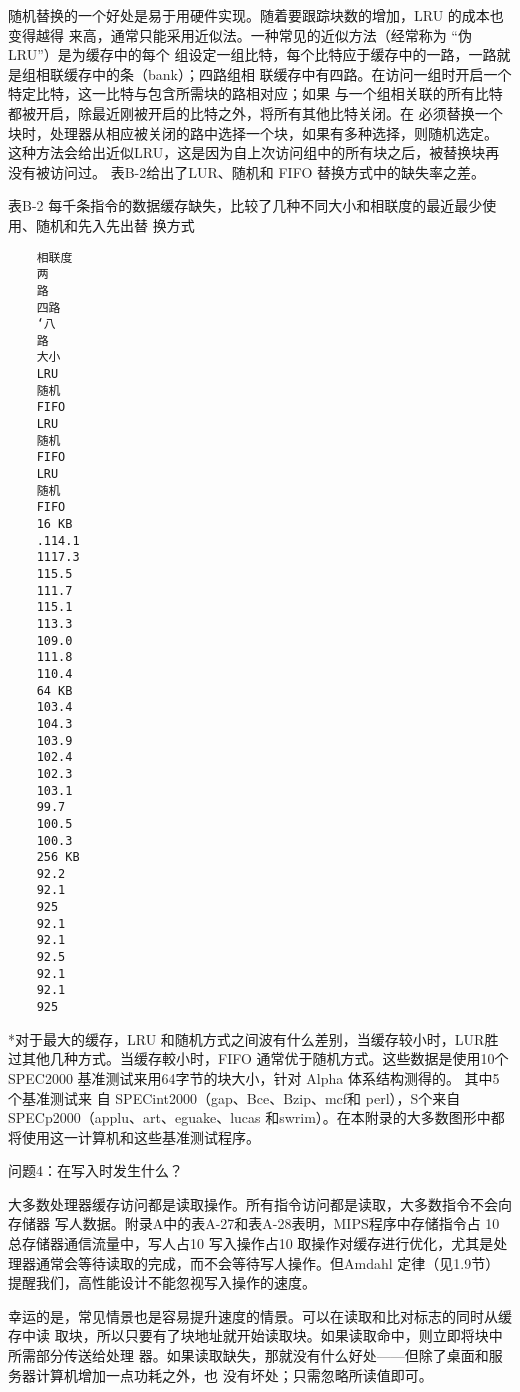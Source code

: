随机替换的一个好处是易于用硬件实现。随着要跟踪块数的增加，LRU 的成本也变得越得
来高，通常只能采用近似法。一种常见的近似方法（经常称为 “伪 LRU”）是为缓存中的每个
组设定一组比特，每个比特应于缓存中的一路，一路就是组相联缓存中的条（bank）；四路组相
联缓存中有四路。在访问一组时开启一个特定比特，这一比特与包含所需块的路相对应；如果
与一个组相关联的所有比特都被开启，除最近刚被开启的比特之外，将所有其他比特关闭。在
必须替换一个块时，处理器从相应被关闭的路中选择一个块，如果有多种选择，则随机选定。
这种方法会给出近似LRU，这是因为自上次访问组中的所有块之后，被替换块再没有被访问过。
表B-2给出了LUR、随机和 FIFO 替换方式中的缺失率之差。


表B-2 每千条指令的数据缓存缺失，比较了几种不同大小和相联度的最近最少使用、随机和先入先出替
换方式
\begin{verbatim}
    相联度
    两
    路
    四路
    ‘八
    路
    大小
    LRU
    随机
    FIFO
    LRU
    随机
    FIFO
    LRU
    随机
    FIFO
    16 KB
    .114.1
    1117.3
    115.5
    111.7
    115.1
    113.3
    109.0
    111.8
    110.4
    64 KB
    103.4
    104.3
    103.9
    102.4
    102.3
    103.1
    99.7
    100.5
    100.3
    256 KB
    92.2
    92.1
    925
    92.1
    92.1
    92.5
    92.1
    92.1
    925
\end{verbatim}
*对于最大的缓存，LRU 和随机方式之间波有什么差别，当缓存较小时，LUR胜过其他几种方式。当缓存較小时，FIFO
通常优于随机方式。这些数据是使用10个 SPEC2000 基准测试来用64字节的块大小，针对 Alpha 体系结构测得的。
其中5个基准测试来 自 SPECint2000（gap、Bce、Bzip、mcf和 perl），S个来自 SPECp2000（applu、art、eguake、lucas
和swrim）。在本附录的大多数图形中都将使用这一计算机和这些基准测试程序。

问题4：在写入时发生什么？

大多数处理器缓存访问都是读取操作。所有指令访问都是读取，大多数指令不会向存储器
写人数据。附录A中的表A-27和表A-28表明，MIPS程序中存储指令占 10%
总存储器通信流量中，写人占10%
写入操作占10%
取操作对缓存进行优化，尤其是处理器通常会等待读取的完成，而不会等待写人操作。但Amdahl
定律（见1.9节）提醒我们，高性能设计不能忽视写入操作的速度。

幸运的是，常见情景也是容易提升速度的情景。可以在读取和比对标志的同时从缓存中读
取块，所以只要有了块地址就开始读取块。如果读取命中，则立即将块中所需部分传送给处理
器。如果读取缺失，那就没有什么好处——但除了桌面和服务器计算机增加一点功耗之外，也
没有坏处；只需忽略所读值即可。

